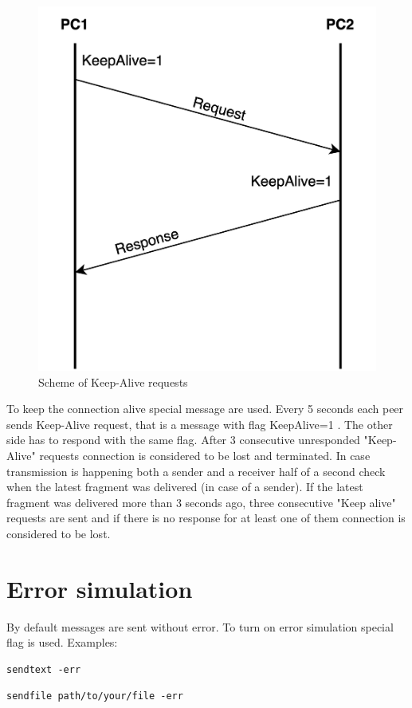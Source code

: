 \documentclass{article}
\begin{document}
\begin{figure}[h]
    \centering
    \includegraphics[width=\textwidth]{images/keepalive.png}
    \caption{Scheme of Keep-Alive requests}
    \label{fig:mesh1}
\end{figure}
To keep the connection alive special message are used. Every 5 seconds each peer sends Keep-Alive request, that is a message with flag KeepAlive=1 . The other side has to respond with the same flag. After 3 consecutive unresponded "Keep-Alive" requests connection is considered to be lost and terminated. In case transmission is happening both a sender and a receiver half of a second check when the latest fragment was delivered (in case of a sender). If the latest fragment was delivered more than 3 seconds ago, three consecutive "Keep alive" requests are sent and if there is no response for at least one of them connection is considered to be lost.

\newpage

\section{Error simulation}

By default messages are sent without error. To turn on error simulation special flag is used. Examples:
\begin{lstlisting}
sendtext -err
\end{lstlisting}
\begin{lstlisting}
sendfile path/to/your/file -err
\end{lstlisting}
\end{document}
